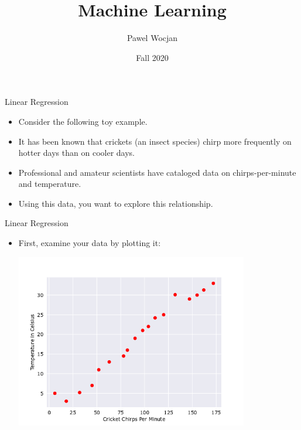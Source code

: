\documentclass{beamer}
\title[ML]{Machine Learning}
\author{Pawel Wocjan}
\institute{University of Central Florida}
\date{Fall 2020}
\begin{document}
\begin{frame}
  \titlepage
\end{frame}


\begin{frame}{Linear Regression}
\begin{itemize}
\item Consider the following toy example.

\medskip
\item It has been known that crickets (an insect species) chirp more frequently on hotter days than on cooler days. 

\medskip
\item Professional and amateur scientists have cataloged data on chirps-per-minute and temperature. 
    
\medskip
\item Using this data, you want to explore this relationship.
\end{itemize}
\end{frame}


\begin{frame}{Linear Regression}
\begin{itemize}
\item First, examine your data by plotting it:
    
\includegraphics[width=0.8\textwidth]{images/CricketPoints.png}    
\end{itemize}
\end{frame}

\end{document}
